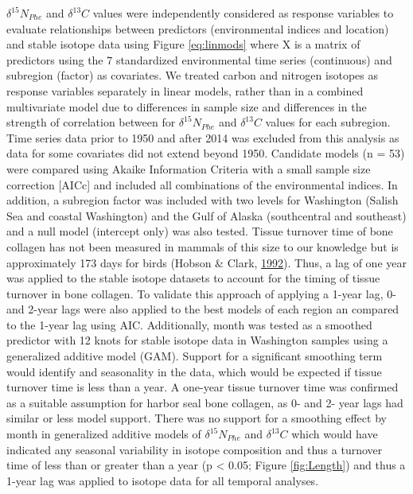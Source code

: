 \documentclass [11pt, proquest] {uwthesis}[2015/03/03]
\begin{document}
\(\delta^{15}N_{Phe}\) and \(\delta^{13}C\) values were independently
considered as response variables to evaluate relationships between
predictors (environmental indices and location) and stable isotope data
using Figure \eqref{eq:linmods} where X is a matrix of predictors using
the 7 standardized environmental time series (continuous) and subregion
(factor) as covariates. We treated carbon and nitrogen isotopes as
response variables separately in linear models, rather than in a
combined multivariate model due to differences in sample size and
differences in the strength of correlation between for
\(\delta^{15}N_{Phe}\) and \(\delta^{13}C\) values for each subregion.
Time series data prior to 1950 and after 2014 was excluded from this
analysis as data for some covariates did not extend beyond 1950.
Candidate models (n = 53) were compared using Akaike Information
Criteria with a small sample size correction {[}AICc{]} and included all
combinations of the environmental indices. In addition, a subregion
factor was included with two levels for Washington (Salish Sea and
coastal Washington) and the Gulf of Alaska (southcentral and southeast)
and a null model (intercept only) was also tested. Tissue turnover time
of bone collagen has not been measured in mammals of this size to our
knowledge but is approximately 173 days for birds (Hobson \& Clark,
\protect\hyperlink{ref-Hobson1992}{1992}). Thus, a lag of one year was
applied to the stable isotope datasets to account for the timing of
tissue turnover in bone collagen. To validate this approach of applying
a 1-year lag, 0- and 2-year lags were also applied to the best models of
each region an compared to the 1-year lag using AIC. Additionally, month
was tested as a smoothed predictor with 12 knots for stable isotope data
in Washington samples using a generalized additive model (GAM). Support
for a significant smoothing term would identify and seasonality in the
data, which would be expected if tissue turnover time is less than a
year. A one-year tissue turnover time was confirmed as a suitable
assumption for harbor seal bone collagen, as 0- and 2- year lags had
similar or less model support. There was no support for a smoothing
effect by month in generalized additive models of \(\delta^{15}N_{Phe}\)
and \(\delta^{13}C\) which would have indicated any seasonal variability
in isotope composition and thus a turnover time of less than or greater
than a year (p \textless{} 0.05; Figure \ref{fig:Length}) and thus a
1-year lag was applied to isotope data for all temporal analyses.
\end{document}
